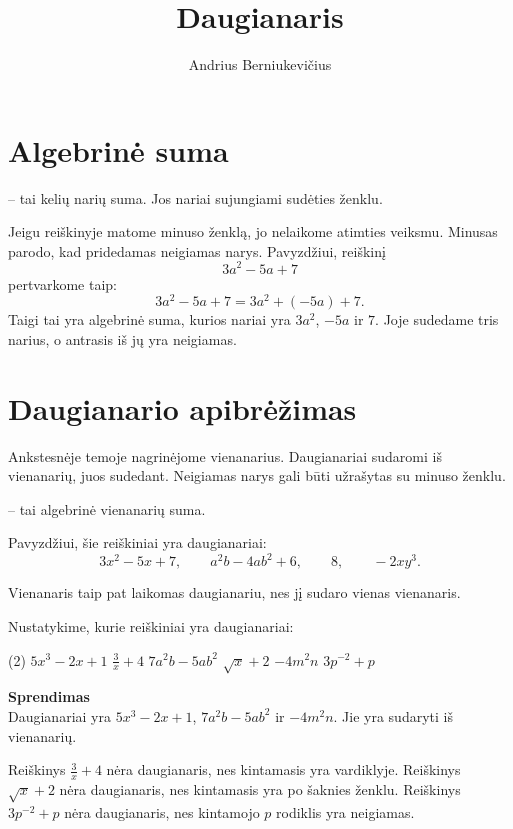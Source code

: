 \documentclass[11pt,a4paper]{scrartcl}
\title{Daugianaris}
\author{Andrius Berniukevičius}
\begin{document}
\maketitle


\section{Algebrinė suma}
\begin{definition}
 -- tai kelių narių suma. Jos nariai sujungiami sudėties ženklu.	
\end{definition} 
Jeigu reiškinyje matome minuso ženklą, jo nelaikome atimties veiksmu. Minusas parodo, kad pridedamas neigiamas narys. Pavyzdžiui, reiškinį
\[
3a^2-5a+7
\]
pertvarkome taip:
\[
3a^2-5a+7=3a^2+(-5a)+7.
\]
Taigi tai yra algebrinė suma, kurios nariai yra $3a^2$, $-5a$ ir $7$. Joje sudedame tris narius, o antrasis iš jų yra neigiamas.

\section{Daugianario apibrėžimas}

Ankstesnėje temoje nagrinėjome vienanarius. Daugianariai sudaromi iš vienanarių, juos sudedant. Neigiamas narys gali būti užrašytas su minuso ženklu.

\begin{definition}
 -- tai algebrinė vienanarių suma.
\end{definition}

Pavyzdžiui, šie reiškiniai yra daugianariai:
\[
3x^2-5x+7, \qquad a^2b-4ab^2+6, \qquad 8, \qquad -2xy^3.
\]

Vienanaris taip pat laikomas daugianariu, nes jį sudaro vienas vienanaris.

\begin{example}
Nustatykime, kurie reiškiniai yra daugianariai:
\begin{tasks}[style=itemize](2)
	\task $5x^3-2x+1$
	\task $\frac{3}{x}+4$
	\task $7a^2b-5ab^2$
	\task $\sqrt{x}+2$
	\task $-4m^2n$
	\task $3p^{-2}+p$
\end{tasks}
\textbf{Sprendimas}\\
Daugianariai yra $5x^3-2x+1$, $7a^2b-5ab^2$ ir $-4m^2n$. Jie yra sudaryti iš vienanarių.

Reiškinys $\frac{3}{x}+4$ nėra daugianaris, nes kintamasis yra vardiklyje. Reiškinys $\sqrt{x}+2$ nėra daugianaris, nes kintamasis yra po šaknies ženklu. Reiškinys $3p^{-2}+p$ nėra daugianaris, nes kintamojo $p$ rodiklis yra neigiamas.
\end{example}
\end{document}
